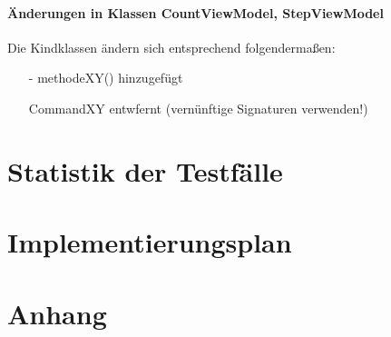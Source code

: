 \documentclass[a4paper,12pt]{article}
\begin{document}
\paragraph{Änderungen in Klassen CountViewModel, StepViewModel}
Die Kindklassen ändern sich entsprechend folgendermaßen:
\begin{itemize}
  \item[-] methodeXY() hinzugefügt
  \item[] CommandXY entwfernt (vernünftige Signaturen verwenden!)
\end{itemize}
\section{Statistik der Testfälle}

\section{Implementierungsplan}

\section{Anhang}




\printglossaries
{}
\end{document}
